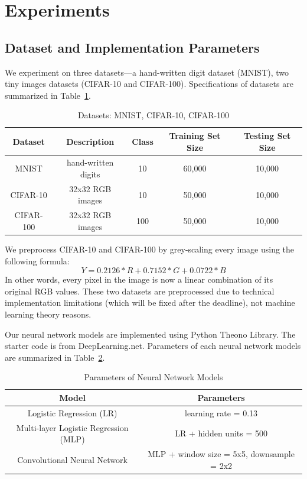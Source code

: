\section{Experiments}
\label{sec:experiments}
\subsection{Dataset and Implementation Parameters}
We experiment on three datasets---a hand-written digit dataset (MNIST),
two tiny images datasets (CIFAR-10 and CIFAR-100).
Specifications of datasets are summarized in Table~\ref{datasets}.
\vspace{-7pt}
\begin{table}[!htbp]
\centering
\begin{tabular}{| c | c | c | c | c |}
\hline
Dataset & Description & Class & Training Set Size & Testing Set Size \\
\hline
MNIST & hand-written digits & 10 & 60,000 & 10,000\\
CIFAR-10 & 32x32 RGB images & 10 & 50,000 & 10,000\\
CIFAR-100 & 32x32 RGB images & 100 & 50,000 & 10,000\\
\hline
\end{tabular}
\caption{Datasets: MNIST, CIFAR-10, CIFAR-100}
\label{datasets}
\end{table}

We preprocess CIFAR-10 and CIFAR-100 by grey-scaling every image using the following formula:
\[
Y = 0.2126 * R + 0.7152 * G + 0.0722 * B
\]
In other words, every pixel in the image is now a linear combination of its
original RGB values. These two datasets are preprocessed due to technical
implementation limitations (which will be fixed after the deadline), not
machine learning theory reasons.

Our neural network models are implemented using Python Theono Library. The
starter code is from DeepLearning.net. Parameters of each neural
network models are summarized in Table~\ref{params}.
\vspace{-7pt}
\begin{table}[!htbp]
\centering
\begin{tabular}{| c | c |}
\hline
Model & Parameters \\
\hline
Logistic Regression (LR) & learning rate = 0.13 \\
Multi-layer Logistic Regression (MLP) & LR + hidden units = 500 \\
Convolutional Neural Network & MLP + window size = 5x5, downsample = 2x2\\
\hline
\end{tabular}
\caption{Parameters of Neural Network Models}
\label{params}
\end{table}

